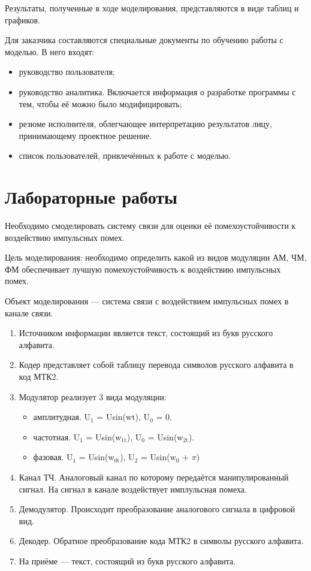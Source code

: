 \documentclass[12pt, russian, oneside, article]{ncc}
\begin{document}
Результаты, полученные в ходе моделирования, представляются в виде таблиц и графиков.

Для заказчика составляются специальные документы по обучению работы с моделью. В него входят:
\begin{itemize}
\item руководство пользователя;
\item руководство аналитика. Включается информация о разработке программы с тем, чтобы её можно было модифицировать;
\item резюме исполнителя, облегчающее интерпретацию результатов лицу, принимающему проектное решение.
\item список пользователей, привлечённых к работе с моделью.
\end{itemize}
\section{Лабораторные работы}
\label{sec-9}


Необходимо смоделировать систему связи для оценки её помехоустойчивости к воздействию импульсных помех.

Цель моделирования: необходимо определить какой из видов модуляции АМ, ЧМ, ФМ обеспечивает лучшую помехоустойчивость к воздействию импульсных помех.

Объект моделирования --- система связи с воздействием импульсных помех в канале связи.

\begin{enumerate}
\item Источником информации является текст, состоящий из букв русского алфавита.
\item Кодер представляет собой таблицу перевода символов русского алфавита в код МТК2.
\item Модулятор реализует 3 вида модуляции:

\begin{itemize}
\item амплитудная. U$_1$ = Usin(wt), U$_0$ = 0.
\item частотная. U$_1$ = Usin(w$_{\mathrm{1t}}$), U$_0$ = Usin(w$_{\mathrm{2t}}$).
\item фазовая. U$_1$ = Usin(w$_{\mathrm{0t}}$), U$_2$ = Usin(w$_0$ + $\pi$)
\end{itemize}

\item Канал ТЧ. Аналоговый канал по которому передаётся манипулированный сигнал. На сигнал в канале воздействует имплульсная помеха.
\item Демодулятор. Происходит преобразование аналогового сигнала в цифровой вид.
\item Декодер. Обратное преобразование кода МТК2 в символы русского алфавита.
\item На приёме --- текст, состоящий из букв русского алфавита.
\end{enumerate}
\end{document}
